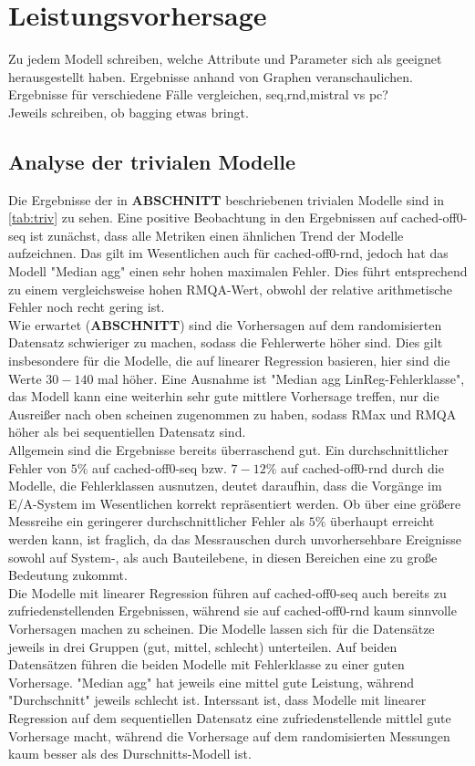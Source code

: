 \documentclass[
	12pt,
	a4paper,
	BCOR10mm,
	DIV14,
	listof=totoc,
	bibliography=totoc,
	headsepline
]{scrreprt}
\begin{document}
\section{Leistungsvorhersage}
Zu jedem Modell schreiben, welche Attribute und Parameter sich als geeignet herausgestellt haben. Ergebnisse anhand von Graphen veranschaulichen.\\
Ergebnisse für verschiedene Fälle vergleichen, seq,rnd,mistral vs pc?\\
Jeweils schreiben, ob bagging etwas bringt.

\subsection{Analyse der trivialen Modelle}

Die Ergebnisse der in \textbf{ABSCHNITT} beschriebenen trivialen Modelle sind in \ref{tab:triv} zu sehen. Eine positive Beobachtung in den Ergebnissen auf cached-off0-seq ist zunächst, dass alle Metriken einen ähnlichen Trend der  Modelle aufzeichnen. Das gilt im Wesentlichen auch für cached-off0-rnd, jedoch hat das Modell "Median agg" einen sehr hohen maximalen Fehler. Dies führt entsprechend zu einem vergleichsweise hohen RMQA-Wert, obwohl der relative arithmetische Fehler noch recht gering ist. \\
Wie erwartet (\textbf{ABSCHNITT}) sind die Vorhersagen auf dem randomisierten Datensatz schwieriger zu machen, sodass die Fehlerwerte höher sind. Dies gilt insbesondere für die Modelle, die auf linearer Regression basieren, hier sind die Werte $30-140$ mal höher. Eine Ausnahme ist "Median agg LinReg-Fehlerklasse", das Modell kann eine weiterhin sehr gute mittlere Vorhersage treffen, nur die Ausreißer nach oben scheinen zugenommen zu haben, sodass RMax und RMQA höher als bei sequentiellen Datensatz sind.\\
Allgemein sind die Ergebnisse bereits überraschend gut. Ein durchschnittlicher Fehler von $5\%$ auf cached-off0-seq bzw. $7-12\%$ auf cached-off0-rnd durch die Modelle, die Fehlerklassen ausnutzen, deutet daraufhin, dass die Vorgänge im E/A-System im Wesentlichen korrekt repräsentiert werden. Ob über eine größere Messreihe ein geringerer durchschnittlicher Fehler als $5\%$ überhaupt erreicht werden kann, ist fraglich, da das Messrauschen durch unvorhersehbare Ereignisse sowohl auf System-, als auch Bauteilebene, in diesen Bereichen eine zu große Bedeutung zukommt.\\
Die Modelle mit linearer Regression führen auf cached-off0-seq auch bereits zu zufriedenstellenden Ergebnissen, während sie auf cached-off0-rnd kaum sinnvolle Vorhersagen machen zu scheinen. Die Modelle lassen sich für die Datensätze jeweils in drei Gruppen (gut, mittel, schlecht) unterteilen. Auf beiden Datensätzen führen die beiden Modelle mit Fehlerklasse zu einer guten Vorhersage. "Median agg" hat jeweils eine mittel gute Leistung, während "Durchschnitt" jeweils schlecht ist. Interssant ist, dass Modelle mit linearer Regression auf dem sequentiellen Datensatz eine zufriedenstellende mittlel gute Vorhersage macht, während die Vorhersage auf dem randomisierten Messungen kaum besser als des Durschnitts-Modell ist. \\ 
\end{document}
